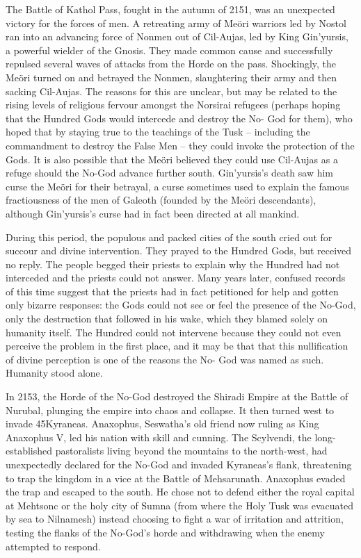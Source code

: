 \documentclass[]{book}
\begin{document}
The Battle of Kathol Pass, fought in the autumn of 2151, was an unexpected victory for
the forces of men. A retreating army of Meöri warriors led by Nostol ran into an
advancing force of Nonmen out of Cil-Aujas, led by King Gin'yursis, a powerful wielder
of the Gnosis. They made common cause and successfully repulsed several waves of
attacks from the Horde on the pass. Shockingly, the Meöri turned on and betrayed the
Nonmen, slaughtering their army and then sacking Cil-Aujas. The reasons for this are
unclear, but may be related to the rising levels of religious fervour amongst the Norsirai
refugees (perhaps hoping that the Hundred Gods would intercede and destroy the No-
God for them), who hoped that by staying true to the teachings of the Tusk -- including
the commandment to destroy the False Men -- they could invoke the protection of the
Gods. It is also possible that the Meöri believed they could use Cil-Aujas as a refuge
should the No-God advance further south. Gin'yursis's death saw him curse the Meöri
for their betrayal, a curse sometimes used to explain the famous fractiousness of the
men of Galeoth (founded by the Meöri descendants), although Gin'yursis's curse had
in fact been directed at all mankind.

During this period, the populous and packed cities of the south cried out for succour
and divine intervention. They prayed to the Hundred Gods, but received no reply. The
people begged their priests to explain why the Hundred had not interceded and the
priests could not answer. Many years later, confused records of this time suggest that
the priests had in fact petitioned for help and gotten only bizarre responses: the Gods
could not see or feel the presence of the No-God, only the destruction that followed in
his wake, which they blamed solely on humanity itself. The Hundred could not
intervene because they could not even perceive the problem in the first place, and it
may be that that this nullification of divine perception is one of the reasons the No-
God was named as such. Humanity stood alone.

In 2153, the Horde of the No-God destroyed the Shiradi Empire at the Battle of
Nurubal, plunging the empire into chaos and collapse. It then turned west to invade
45Kyraneas. Anaxophus, Seswatha's old friend now ruling as King Anaxophus V, led his
nation with skill and cunning. The Scylvendi, the long-established pastoralists living
beyond the mountains to the north-west, had unexpectedly declared for the No-God
and invaded Kyraneas's flank, threatening to trap the kingdom in a vice at the Battle of
Mehsarunath. Anaxophus evaded the trap and escaped to the south. He chose not to
defend either the royal capital at Mehtsonc or the holy city of Sumna (from where the
Holy Tusk was evacuated by sea to Nilnamesh) instead choosing to fight a war of
irritation and attrition, testing the flanks of the No-God's horde and withdrawing when
the enemy attempted to respond.
\end{document}
